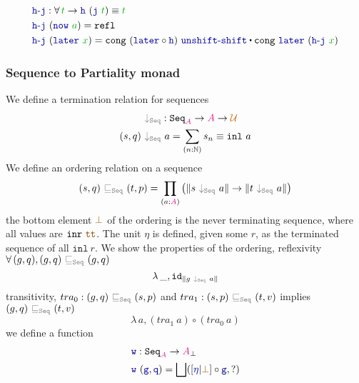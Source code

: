 \documentclass[twoside,11pt,openright]{report}
\theoremstyle{plain} %
\theoremstyle{definition}
\theoremstyle{remark}
\newcommand*{\term}[1]{\textcolor{green!70!black}{#1}} %
\newcommand*{\type}[1]{\textcolor{magenta!90!black}{#1}}
\newcommand*{\universe}[1]{\textcolor{orange!80!black}{#1}}
\newcommand*{\relation}[1]{\textcolor{gray}{\ensuremath{\mathtt{#1}}}}
\newcommand*{\constant}[1]{\textcolor{orange!60!black}{\ensuremath{\mathtt{#1}}}}
\newcommand*{\function}[1]{\textcolor{blue!60!black}{\ensuremath{\mathtt{#1}}}}
\newcommand*{\typeformer}[1]{\ensuremath{\mathtt{#1}}}
\newcommand{\ct}{%
  \mathchoice{\mathbin{\raisebox{0.5ex}{$\displaystyle\centerdot$}}}%
             {\mathbin{\raisebox{0.5ex}{$\centerdot$}}}%
             {\mathbin{\raisebox{0.25ex}{$\scriptstyle\,\centerdot\,$}}}%
             {\mathbin{\raisebox{0.1ex}{$\scriptscriptstyle\,\centerdot\,$}}}
}
\begin{document}
\begin{equation}
  \begin{aligned}
    \function{h\text{-}j} &: \forall\,\term{t} \rightarrow \function{h}~(\function{j}~\term{t}) \equiv \term{t} \\
    \function{h\text{-}j}&~(\function{now}~\term{a}) = \mathtt{refl} \\
    \function{h\text{-}j}&~(\function{later}~\term{x}) = \mathtt{cong}~(\function{later} \circ \function{h})~\function{unshift\text{-}shift} \ct \mathtt{cong}~\function{later}~(\function{h\text{-}j}~\term{x})
  \end{aligned}
\end{equation}
\subsubsection{Sequence to Partiality monad}
We define a termination relation for sequences
\begin{equation}
  \begin{aligned}
    \relation{\downarrow_{\mathtt{Seq}}} &: \typeformer{Seq}_{\type{A}} \rightarrow \type{A} \rightarrow \universe{\mathcal{U}} \\
    (s,q)~\relation{\downarrow_{\mathtt{Seq}}}&~a = \sum_{(n : \mathbb{N})} s_n \equiv \mathtt{inl}~a
  \end{aligned}
\end{equation}
We define an ordering relation on a sequence
\begin{equation}
  (s,q)~\relation{\sqsubseteq_{\mathtt{Seq}}}~(t,p) = \prod_{(a : \type{A})} \left(\|s~\relation{\downarrow_{\mathtt{Seq}}}~a\| \rightarrow \| t~\relation{\downarrow_{\mathtt{Seq}}}~a\|\right)
\end{equation}
the bottom element \(\constant{\bot}\) of the ordering is the never terminating sequence, where all values are \(\mathtt{inr}~\constant{tt}\). The unit \(\eta\) is defined, given some \(r\), as the terminated sequence of all \(\mathtt{inl}~r\).
We show the properties of the ordering, reflexivity \(\forall\,(g,q), (g,q)~\relation{\sqsubseteq_{\mathtt{Seq}}}~(g,q)\)
\begin{equation}
  \lambda\,\_ , \mathtt{id}_{\|g~\relation{\downarrow_{\mathtt{Seq}}}~a\|}
\end{equation}
transitivity, \(tra_0 : (g,q)~\relation{\sqsubseteq_{\mathtt{Seq}}}~(s,p)\) and \(tra_1 : (s,p)~\relation{\sqsubseteq_{\mathtt{Seq}}}~(t,v)\) implies \((g,q)~\relation{\sqsubseteq_{\mathtt{Seq}}}~(t,v)\)
\begin{equation}
  \lambda\,a, (tra_1~a) \circ (tra_0~a)
\end{equation}
we define a function
\begin{equation}
  \begin{aligned}
    \function{w} &: \typeformer{Seq}_{\type{A}} \rightarrow \type{A}_{\bot} \\
    \function{w}&~(\function{g},\function{q}) = \bigsqcup ([\function{\eta}|\constant{\bot}] \circ \function{g} , ?)
  \end{aligned}
\end{equation}
\end{document}

